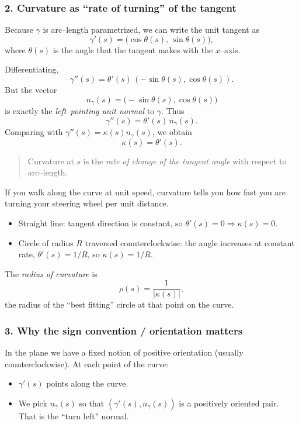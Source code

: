 \documentclass[12pt,a4paper]{article}
\theoremstyle{plain}
\theoremstyle{definition}      %
\begin{document}
	\subsubsection*{2. Curvature as ``rate of turning'' of the tangent}
	
	Because $\gamma$ is arc--length parametrized, we can write the unit tangent as
	\[
	\gamma'(s) = \bigl(\cos\theta(s),\,\sin\theta(s)\bigr),
	\]
	where $\theta(s)$ is the angle that the tangent makes with the $x$--axis.
	
	Differentiating,
	\[
	\gamma''(s) = \theta'(s)\,(-\sin\theta(s),\cos\theta(s)).
	\]
	But the vector
	\[
	n_\gamma(s) = \bigl(-\sin\theta(s),\cos\theta(s)\bigr)
	\]
	is exactly the \emph{left--pointing unit normal} to $\gamma$.  Thus
	\[
	\gamma''(s) = \theta'(s)\,n_\gamma(s).
	\]
	Comparing with $\gamma''(s)=\kappa(s)n_\gamma(s)$, we obtain
	\[
	\boxed{\kappa(s)=\theta'(s)}.
	\]
	
	\begin{quote}
		Curvature at $s$ is the \emph{rate of change of the tangent angle} with
		respect to arc--length.
	\end{quote}
	
	If you walk along the curve at unit speed, curvature tells you how fast you
	are turning your steering wheel per unit distance.
	
	\begin{itemize}
		\item Straight line: tangent direction is constant, so
		$\theta'(s)=0\Rightarrow \kappa(s)=0$.
		\item Circle of radius $R$ traversed counterclockwise: the angle increases at
		constant rate, $\theta'(s)=1/R$, so $\kappa(s)=1/R$.
	\end{itemize}
	
	The \emph{radius of curvature} is
	\[
	\rho(s) = \frac{1}{|\kappa(s)|},
	\]
	the radius of the ``best fitting'' circle at that point on the curve.
	
	\subsubsection*{3. Why the sign convention / orientation matters}
	
	In the plane we have a fixed notion of positive orientation (usually
	counterclockwise).  At each point of the curve:
	
	\begin{itemize}
		\item $\gamma'(s)$ points along the curve.
		\item We pick $n_\gamma(s)$ so that $(\gamma'(s),n_\gamma(s))$ is a
		positively oriented pair.  That is the ``turn left'' normal.
	\end{itemize}
	
\end{document}
